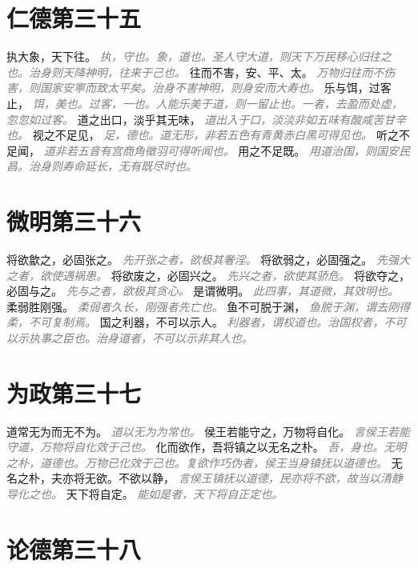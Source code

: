 \documentclass[a4paper,zihao=-4,oneside,landscape,UTF8]{ctexart}
\newcommand{\zhushi}[1]{\scriptsize{\textit{\textcolor{gray}{#1}}}\normalsize}
\begin{document}
\section{仁德第三十五}

执大象，天下往。
\zhushi{执，守也。象，道也。圣人守大道，则天下万民移心归往之也。治身则天降神明，往来于己也。}
往而不害，安、平、太。
\zhushi{万物归往而不伤害，则国家安寕而致太平矣。治身不害神明，则身安而大寿也。}
乐与饵，过客止，
\zhushi{饵，美也。过客，一也。人能乐美于道，则一留止也。一者，去盈而处虚，忽忽如过客。}
道之出口，淡乎其无味，
\zhushi{道出入于口，淡淡非如五味有酸咸苦甘辛也。}
视之不足见，
\zhushi{足，德也。道无形，非若五色有青黄赤白黑可得见也。}
听之不足闻，
\zhushi{道非若五音有宫商角徵羽可得听闻也。}
用之不足既。
\zhushi{用道治国，则国安民昌。治身则寿命延长，无有既尽时也。}


\section{微明第三十六}

将欲歙之，必固张之。
\zhushi{先开张之者，欲极其奢淫。}
将欲弱之，必固强之。
\zhushi{先强大之者，欲使遇祸患。}
将欲废之，必固兴之。
\zhushi{先兴之者，欲使其骄危。}
将欲夺之，必固与之。
\zhushi{先与之者，欲极其贪心。}
是谓微明。
\zhushi{此四事，其道微，其效明也。}
柔弱胜刚强。
\zhushi{柔弱者久长，刚强者先亡也。}
鱼不可脱于渊，
\zhushi{鱼脱于渊，谓去刚得柔，不可复制焉。}
国之利器，不可以示人。
\zhushi{利器者，谓权道也。治国权者，不可以示执事之臣也。治身道者，不可以示非其人也。}


\section{为政第三十七}

道常无为而无不为。
\zhushi{道以无为为常也。}
侯王若能守之，万物将自化。
\zhushi{言侯王若能守道，万物将自化效于己也。}
化而欲作，吾将镇之以无名之朴。
\zhushi{吾，身也。无明之朴，道德也。万物已化效于己也。复欲作巧伪者，侯王当身镇抚以道德也。}
无名之朴，夫亦将无欲。不欲以静，
\zhushi{言侯王镇抚以道德，民亦将不欲，故当以清静导化之也。}
天下将自定。
\zhushi{能如是者，天下将自正定也。}


\section{论德第三十八}
\end{document}
